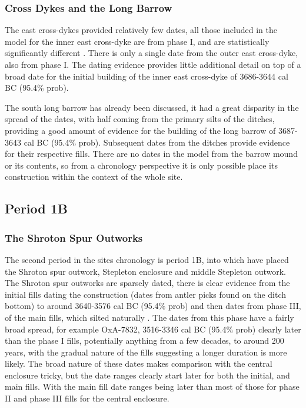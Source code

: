 \subsubsection{Cross Dykes and the Long Barrow}
The east cross-dykes provided relatively few dates, all those included in the model for the inner east cross-dyke are from phase I, and are statistically significantly different \citep[401]{Mercer:2008fk}. There is only a single date from the outer east cross-dyke, also from phase I. The dating evidence provides little additional detail on top of a broad date for the initial building of the inner east cross-dyke of 3686-3644 cal BC (95.4\% prob). 

The south long barrow has already been discussed, it had a great disparity in the spread of the dates, with half coming from the primary silts of the ditches, providing a good amount of evidence for the building of the long barrow of 3687-3643 cal BC (95.4\% prob). Subsequent dates from the ditches provide evidence for their respective fills. There are no dates in the model from the barrow mound or its contents, so from a chronology perspective it is only possible place its construction within the context of the whole site.

\subsection{Period 1B}
\subsubsection{The Shroton Spur Outworks}
The second period in the sites chronology is period 1B, into which \citet{Whittle:2011kl} have placed the Shroton spur outwork, Stepleton enclosure and middle Stepleton outwork. The Shroton spur outworks are sparsely dated, there is clear evidence from the initial fills dating the construction (dates from antler picks found on the ditch bottom) to around 3640-3576 cal BC (95.4\% prob) and then dates from phase III, of the main fills, which silted naturally \citep[189]{Mercer:2008fk}. The dates from this phase have a fairly broad spread, for example OxA-7832, 3516-3346 cal BC (95.4\% prob) clearly later than the phase I fills, potentially anything from a few decades, to around 200 years, with the gradual nature of the fills suggesting a longer duration is more likely. The broad nature of these dates makes comparison with the central enclosure tricky, but the date ranges clearly start later for both the initial, and main fills. With the main fill date ranges being later than most of those for phase II and phase III fills for the central enclosure.

